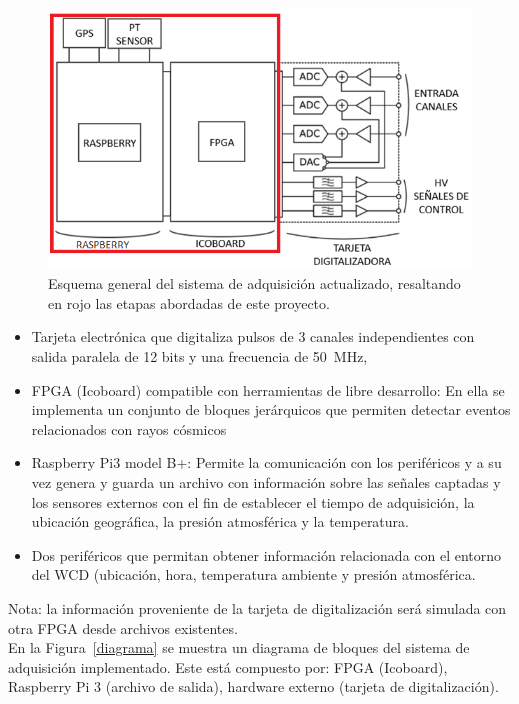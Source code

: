 \begin{figure}[h] %
\includegraphics[scale=0.65]{Figs/pmtvie.png} 
\centering
\caption[Esquema general del sistema de adquisición actualizado]{Esquema general del sistema de adquisición actualizado, resaltando en rojo las etapas abordadas de este proyecto.} 
\label{sistema}
\end{figure}
\begin{itemize}
    \item Tarjeta electrónica que digitaliza pulsos de 3 canales independientes con salida paralela de 12 bits y una frecuencia de 50~MHz,
   \item FPGA (Icoboard) compatible con herramientas de libre desarrollo: En ella
 se implementa un conjunto de bloques jerárquicos que permiten detectar eventos relacionados con rayos cósmicos
   \item Raspberry Pi3 model B+: Permite la comunicación con los periféricos y a su vez  genera y guarda un archivo con información sobre las señales captadas y los sensores externos con el fin de establecer el tiempo de adquisición, la ubicación geográfica, la presión atmosférica y la temperatura.
   \item Dos periféricos que permitan obtener información relacionada con el entorno del WCD (ubicación, hora, temperatura ambiente y presión atmosférica.
\end{itemize}
Nota: la información proveniente de la tarjeta de digitalización será simulada con otra FPGA desde archivos existentes.\\
En la Figura~\ref{diagrama} se muestra un diagrama de bloques del sistema de adquisición implementado.
Este está compuesto por: FPGA   (Icoboard), Raspberry Pi 3   (archivo de salida), hardware externo (tarjeta de digitalización).

